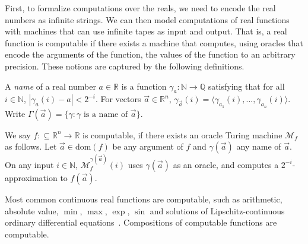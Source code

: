 \documentclass[envcountsect]{llncs}
\newcommand{\dom}{\mathrm{dom}}
\begin{document}
First, to formalize computations over the reals, we need to encode the
real numbers as infinite strings. We can then model
computations of real functions with machines that can use infinite tapes as
input and output. That is, a real function is computable if there exists a
machine that computes, using oracles that encode the arguments of the function,
the values of the function to an arbitrary precision. These
notions are captured by the following definitions.
\begin{definition}
A {\em name} of a real number $a\in \mathbb{R}$ is a function
$\mathcal{\gamma}_a: \mathbb{N}\rightarrow \mathbb{Q}$ satisfying that for all
$i\in \mathbb{N}$, $|\gamma_a(i) - a|<2^{-i}.$ For vectors $\vec a\in
\mathbb{R}^n$,
$\gamma_{\vec a}(i) = \langle \gamma_{a_1}(i), ..., \gamma_{a_n}(i)\rangle$.
Write $\Gamma(\vec a) = \{\gamma: \gamma\mbox{ is a name of }\vec a\}$.
\end{definition}
\begin{definition} We say
$f:\subseteq\mathbb{R}^n\rightarrow \mathbb{R}$ is computable, if there exists
an oracle Turing machine $\mathcal{M}_f$ as follows. Let $\vec a\in \dom(f)$
be any argument of $f$ and $\gamma(\vec a)$
any name of $\vec a$. On any input $i\in \mathbb{N}$,
$\mathcal{M}_f^{\gamma(\vec a)}(i)$ uses $\gamma(\vec a)$ as an oracle, and
computes a $2^{-i}$-approximation to $f(\vec a)$.
\end{definition}
Most common continuous real functions are computable, such as
arithmetic, absolute value, $\min$, $\max$, $\exp$, $\sin$ and solutions of
Lipschitz-continuous ordinary differential equations~\cite{CAbook}. Compositions
of computable functions are computable.
\end{document}
